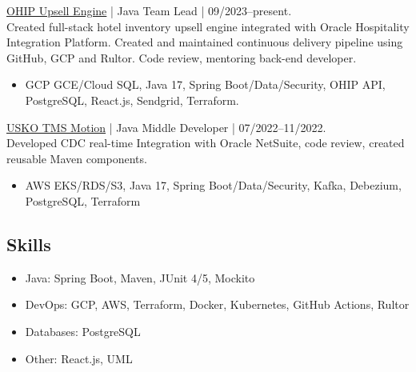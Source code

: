 \documentclass{h1alexbel}
\begin{document}
    {\href{https://upsell.northviewhg.com}{OHIP Upsell Engine} | Java Team Lead | 09/2023--present.\\
    Created full-stack hotel inventory upsell engine integrated with Oracle Hospitality Integration Platform.
    Created and maintained continuous delivery pipeline using GitHub, GCP and Rultor.
    Code review, mentoring back-end developer.
    \vspace{-7pt}
    \begin{itemize}
        \vspace{-7pt}
        \item GCP GCE/Cloud SQL, Java 17, Spring Boot/Data/Security, OHIP API, PostgreSQL, React.js, Sendgrid, Terraform.
    \end{itemize}
    \vspace{-7pt}
    {\href{https://motiontms.com}{USKO TMS Motion} | Java Middle Developer | 07/2022--11/2022.\\
    Developed CDC real-time Integration with Oracle NetSuite, code review, created reusable Maven components.
    \vspace{-7pt}
    \begin{itemize}
        \vspace{-7pt}
        \item AWS EKS/RDS/S3, Java 17, Spring Boot/Data/Security, Kafka, Debezium, PostgreSQL, Terraform
    \end{itemize}
    \vspace{-7pt}


    \subsection*{Skills}
    \vspace{-7pt}
    \small
    \begin{itemize}
        \item Java: Spring Boot, Maven, JUnit 4/5, Mockito
        \vspace{-7pt}
        \item DevOps: GCP, AWS, Terraform, Docker, Kubernetes, GitHub Actions, Rultor
        \vspace{-7pt}
        \item Databases: PostgreSQL
        \vspace{-7pt}
        \item Other: React.js, UML
        \vspace{-7pt}
    \end{itemize}

}}
\end{document}
